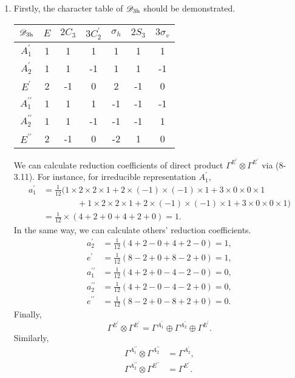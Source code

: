 \documentclass[a4paper]{book}
\begin{document}
\begin{solution}
\begin{enumerate}[label=(\alph*)]
		\item Firstly, the character table of $\mathscr{D}_{\rm 3h}$ should be demonstrated.
		\begin{center}
		\begin{tabular}{ccccccc}\hline
	$\mathscr{D}_{\rm 3h}$ & $E$ & $2C_3$ & $3C^\prime_2$ & $\sigma_h$ & $2S_3$ &$3\sigma_v$ \\ \hline
			$A^\prime_1$	&	1	&	1	&	1	&	1	&	1	&	1	\\
			$A^\prime_2$	&	1	&	1	&	-1	&	1	&	1	&	-1	\\
			$E^\prime$		&	2	&	-1	&	0	&	2	&	-1	&	0	\\
			$A^{\prime\prime}_1$	&	1	&	1	&	1	&	-1	&	-1	&	-1	\\
			$A^{\prime\prime}_2$	&	1	&	1	&	-1	&	-1	&	-1	&	1	\\
			$E^{\prime\prime}$	&	2	&	-1	&	0	&	-2	&	1	&	0	\\ \hline
		\end{tabular}
		\end{center}
		
		We can calculate reduction coefficients of direct product $\Gamma^{E^\prime}\otimes\Gamma^{E^\prime}$ via (8-3.11). For instance, for irreducible representation $A^\prime_1$,
		\begin{align*}
			a^\prime_{1} &= \frac{1}{12} ( 1 \times 2 \times 2 \times 1 + 2 \times (-1) \times (-1) \times 1 + 3 \times 0 \times 0 \times 1 \\
			&\hspace{4em} + 1 \times 2 \times 2 \times 1 + 2 \times (-1) \times (-1) \times 1 + 3 \times 0 \times 0 \times 1 ) \\
			&= \frac{1}{12} \times ( 4 + 2 + 0 + 4 + 2 + 0 ) = 1.
		\end{align*}
		In the same way, we can calculate others' reduction coefficients.
		\begin{align*}
			a^\prime_{2} &= \frac{1}{12} ( 4 + 2 - 0 + 4 + 2 - 0 )= 1, \\
			e^\prime &= \frac{1}{12} ( 8 - 2 + 0 + 8 - 2 + 0 )= 1, \\
			a^{\prime\prime}_{1} &= \frac{1}{12} ( 4 + 2 + 0 - 4 - 2 - 0 )= 0, \\
			a^{\prime\prime}_{2} &= \frac{1}{12} ( 4 + 2 - 0 - 4 - 2 + 0 )= 0, \\
			e^{\prime\prime} &= \frac{1}{12} ( 8 - 2 + 0 - 8 + 2 + 0 )= 0. 
		\end{align*}
		Finally, 
		\begin{equation}
			\Gamma^{E^\prime}\otimes\Gamma^{E^\prime} = \Gamma^{A^\prime_1} \oplus \Gamma^{A^\prime_2} \oplus \Gamma^{E^\prime}.
		\end{equation}
		Similarly,
		\begin{align}
			\Gamma^{A^{\prime\prime}_1}\otimes \Gamma^{A^{\prime\prime}_2} &= \Gamma^{A^{\prime}_2}, \\
			\Gamma^{A^{\prime\prime}_2}\otimes \Gamma^{E^{\prime\prime}} &= \Gamma^{E^{\prime}}.
		\end{align}
		

\end{enumerate}
\end{solution}
\end{document}
